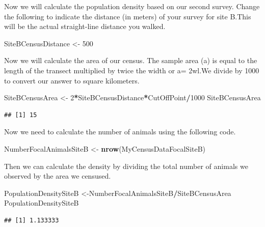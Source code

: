\documentclass[]{book}
\newenvironment{Shaded}{\begin{snugshade}}{\end{snugshade}}
\newcommand{\DecValTok}[1]{\textcolor[rgb]{0.00,0.00,0.81}{#1}}
\newcommand{\KeywordTok}[1]{\textcolor[rgb]{0.13,0.29,0.53}{\textbf{#1}}}
\newcommand{\NormalTok}[1]{#1}
\newcommand{\OperatorTok}[1]{\textcolor[rgb]{0.81,0.36,0.00}{\textbf{#1}}}
\newcommand{\StringTok}[1]{\textcolor[rgb]{0.31,0.60,0.02}{#1}}
\begin{document}
Now we will calculate the population density based on our second survey. Change the following to indicate the distance (in meters) of your survey for site B.This will be the actual straight-line distance you walked.

\begin{Shaded}
\begin{Highlighting}[]
\NormalTok{SiteBCensusDistance <-}\StringTok{ }\DecValTok{500}
\end{Highlighting}
\end{Shaded}

Now we will calculate the area of our census. The sample area (a) is equal to the length of the transect multiplied by twice the width or a= 2wl.We divide by 1000 to convert our answer to square kilometers.

\begin{Shaded}
\begin{Highlighting}[]
\NormalTok{SiteBCensusArea <-}\StringTok{ }\DecValTok{2}\OperatorTok{*}\NormalTok{SiteBCensusDistance}\OperatorTok{*}\NormalTok{CutOffPoint}\OperatorTok{/}\DecValTok{1000}
\NormalTok{SiteBCensusArea}
\end{Highlighting}
\end{Shaded}

\begin{verbatim}
## [1] 15
\end{verbatim}

Now we need to calculate the number of animals using the following code.

\begin{Shaded}
\begin{Highlighting}[]
\NormalTok{NumberFocalAnimalsSiteB <-}\StringTok{ }\KeywordTok{nrow}\NormalTok{(MyCensusDataFocalSiteB)}
\end{Highlighting}
\end{Shaded}

Then we can calculate the density by dividing the total number of animals we observed by the area we censused.

\begin{Shaded}
\begin{Highlighting}[]
\NormalTok{PopulationDensitySiteB <-NumberFocalAnimalsSiteB}\OperatorTok{/}\NormalTok{SiteBCensusArea}
\NormalTok{PopulationDensitySiteB}
\end{Highlighting}
\end{Shaded}

\begin{verbatim}
## [1] 1.133333
\end{verbatim}
\end{document}
